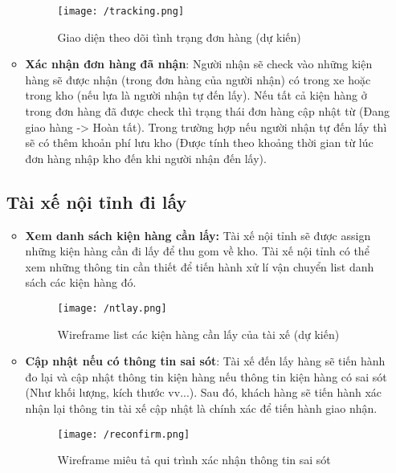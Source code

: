 \begin{itemize}
\begin{itemize}
		\begin{figure}[!ht]
			\texttt{[image: /tracking.png]}
			\centering
			\linebreak
			\caption{Giao diện theo dõi tình trạng đơn hàng (dự kiến)}
		\end{figure}
		
		\item \textbf{Xác nhận đơn hàng đã nhận}: Người nhận sẽ check vào những kiện hàng sẽ được nhận (trong đơn hàng của người nhận) có trong xe hoặc trong kho (nếu lựa là người nhận tự đến lấy). Nếu tất cả kiện hàng ở trong đơn hàng đã được check thì trạng thái đơn hàng cập nhật từ (Đang giao hàng -> Hoàn tất). Trong trường hợp nếu người nhận tự đến lấy thì sẽ có thêm khoản phí lưu kho (Được tính theo khoảng thời gian từ lúc đơn hàng nhập kho đến khi người nhận đến lấy).
	\end{itemize}
	
	\subsection{Tài xế nội tỉnh đi lấy}
	\begin{itemize}
		\item \textbf{Xem danh sách kiện hàng cần lấy:} Tài xế nội tỉnh sẽ được assign những kiện hàng cần đi lấy để thu gom về kho. Tài xế nội tỉnh có thể xem những thông tin cần thiết để tiến hành xử lí vận chuyển list danh sách các kiện hàng đó.
		
		\begin{figure}[!ht]
			\texttt{[image: /ntlay.png]}
			\centering
			\linebreak
			\caption{Wireframe list các kiện hàng cần lấy của tài xế (dự kiến)}
		\end{figure}
		
		\item \textbf{Cập nhật nếu có thông tin sai sót}: Tài xế đến lấy hàng sẽ tiến hành đo lại và cập nhật thông tin kiện hàng nếu thông tin kiện hàng có sai sót (Như khối lượng, kích thước vv...). Sau đó, khách hàng sẽ tiến hành xác nhận lại thông tin tài xế cập nhật là chính xác để tiến hành giao nhận.
		
		\newpage
		
		\begin{figure}[!ht]
			\texttt{[image: /reconfirm.png]}
			\centering
			\linebreak
			\caption{Wireframe miêu tả qui trình xác nhận thông tin sai sót}
		\end{figure}
	\end{itemize}
	

\end{itemize}
